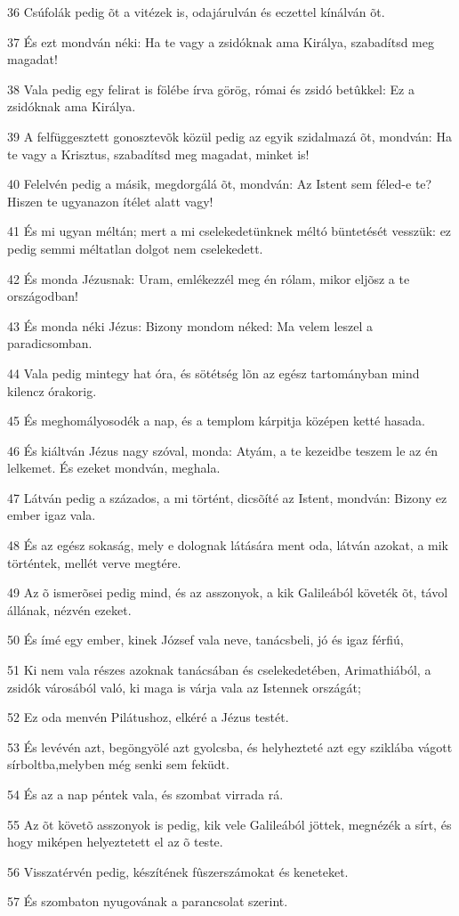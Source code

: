 \par 36 Csúfolák pedig õt a vitézek is, odajárulván és eczettel kínálván õt.
\par 37 És ezt mondván néki: Ha te vagy a zsidóknak ama Királya, szabadítsd meg magadat!
\par 38 Vala pedig egy felirat is fölébe írva görög, római és zsidó betûkkel: Ez a zsidóknak ama Királya.
\par 39 A felfüggesztett gonosztevõk közül pedig az egyik szidalmazá õt, mondván: Ha te vagy a Krisztus, szabadítsd meg magadat, minket is!
\par 40 Felelvén pedig a másik, megdorgálá õt, mondván: Az Istent sem féled-e te? Hiszen te ugyanazon ítélet alatt vagy!
\par 41 És mi ugyan méltán; mert a mi cselekedetünknek méltó büntetését vesszük: ez pedig semmi méltatlan dolgot nem  cselekedett.
\par 42 És monda Jézusnak: Uram, emlékezzél meg én rólam, mikor eljõsz a te országodban!
\par 43 És monda néki Jézus: Bizony mondom néked: Ma velem leszel a paradicsomban.
\par 44 Vala pedig mintegy hat óra, és sötétség lõn az egész tartományban mind kilencz órakorig.
\par 45 És meghomályosodék a nap, és a templom kárpitja középen ketté hasada.
\par 46 És kiáltván Jézus nagy szóval, monda: Atyám, a te kezeidbe teszem le az én lelkemet. És ezeket mondván, meghala.
\par 47 Látván pedig a százados, a mi történt, dicsõíté az Istent, mondván: Bizony ez ember igaz vala.
\par 48 És az egész sokaság, mely e dolognak látására ment oda, látván azokat, a mik történtek, mellét verve megtére.
\par 49 Az õ ismerõsei pedig mind, és az asszonyok, a kik Galileából követék õt, távol állának, nézvén ezeket.
\par 50 És ímé egy ember, kinek József vala neve, tanácsbeli, jó és igaz férfiú,
\par 51 Ki nem vala részes azoknak tanácsában és cselekedetében, Arimathiából, a zsidók városából való, ki maga is várja vala az Istennek országát;
\par 52 Ez oda menvén Pilátushoz, elkéré a Jézus testét.
\par 53 És levévén azt, begöngyölé azt gyolcsba, és helyhezteté azt egy sziklába vágott sírboltba,melyben még senki sem feküdt.
\par 54 És az a nap péntek vala, és szombat virrada rá.
\par 55 Az õt követõ asszonyok is pedig, kik vele Galileából jöttek, megnézék a sírt, és hogy miképen helyeztetett el az õ teste.
\par 56 Visszatérvén pedig, készítének fûszerszámokat és keneteket.
\par 57 És szombaton nyugovának a parancsolat szerint.

